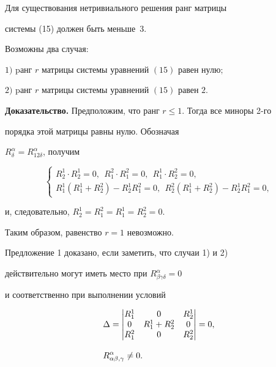 Для существования нетривиального решения ранг матрицы 


системы (15) должен быть меньше~3.





\begin{prop}


Возможны два случая\/${:}$





$1)$ pанг $r$ матрицы системы уравнений $(15)$ равен нулю\/$;$





$2)$ pанг $r$ матрицы системы уравнений $(15)$ равен $2$.


\end{prop}





{\bf Доказательство.} Предположим, что ранг $r\leq 1$. Тогда все миноры 2-го


порядка этой матрицы равны нулю. Обозначая


$R^{\alpha}_{\delta}=R^{\alpha}_{12\delta} $, получим


$$


\begin{cases}


R^1_2\cdot R^1_2=0,\ \ R^2_1\cdot R^2_1=0,\ \ R^1_1\cdot


R^2_2=0,\\


R^1_1(R^1_1+ R^2_2)- R^1_2 R^2_1=0,\ \ R^2_2(R^1_1+ R^2_2)- R^1_2 R^2_1=0,


\end{cases}


$$


и, следовательно, $ R^1_2=R^2_1= R^1_1= R^2_2=0$.





Таким образом, равенство $r=1$ невозможно.


Предложение 1 доказано, если заметить, что случаи 1) и 2)


действительно могут иметь место при $R^{\alpha}_{\beta \gamma \delta }=0 $


и соответственно при выполнении условий


\begin{align}


&\Delta =


\begin{vmatrix}


R^1_1&0&R^1_2\\ 0&R^1_1+R^2_2&0\\ R^2_1&0&R^2_2


\end{vmatrix}


=0,\\[3mm]


&R^{\alpha}_{\alpha \beta, \gamma} \neq 0.\notag


\end{align}


